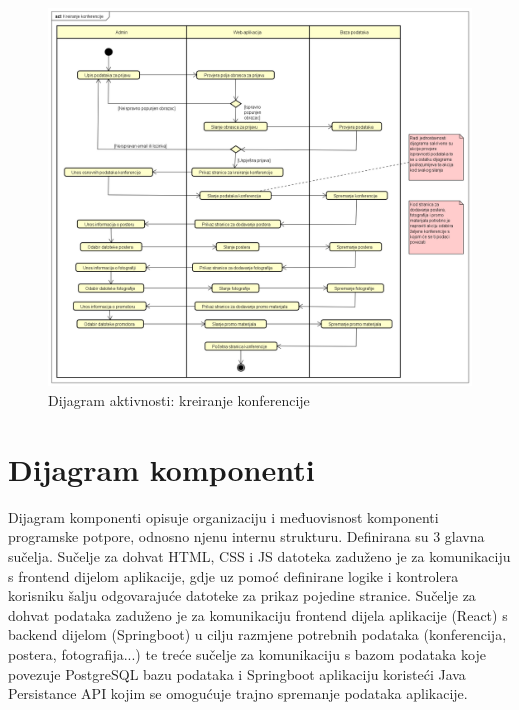 			\begin{figure}[H]
				\includegraphics[width=\textwidth]{slike/dijagramAktivnosti.PNG} %
				\caption{Dijagram aktivnosti: kreiranje konferencije}
				\label{fig:dijagramAktivnosti} %
			\end{figure}
			
			\eject
		\section{Dijagram komponenti}

			 Dijagram komponenti opisuje organizaciju i međuovisnost komponenti programske potpore, odnosno njenu internu strukturu. Definirana su 3 glavna sučelja. Sučelje za dohvat HTML, CSS i JS datoteka zaduženo je za komunikaciju s frontend dijelom aplikacije, gdje uz pomoć definirane logike i kontrolera korisniku šalju odgovarajuće datoteke za prikaz pojedine stranice. Sučelje za dohvat podataka zaduženo je za komunikaciju frontend dijela aplikacije (React) s backend dijelom (Springboot) u cilju razmjene potrebnih podataka (konferencija, postera, fotografija...) te treće sučelje za komunikaciju s bazom podataka koje povezuje PostgreSQL bazu podataka i Springboot aplikaciju koristeći Java Persistance API kojim se omogućuje trajno spremanje podataka aplikacije.
			 
